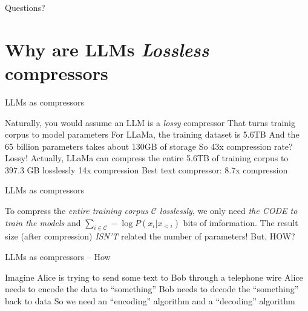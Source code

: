 \documentclass[scheme=plain]{ctexbeamer}
\begin{document}
\begin{frame}[standout]
  Questions?
\end{frame}

\section[LLMs as compressors]{Why are LLMs \emph{Lossless} compressors}

\begin{frame}{LLMs as compressors}
  \begin{outline}
    \1 Naturally, you would assume an LLM is a \emph{lossy} compressor
      \2 That turns trainig corpus to model parameters
      \2 For LLaMa, the training dataset is 5.6TB
      \2 And the 65 billion parameters takes about 130GB of storage
        \3 So 43x compression rate?
        \3 Lossy!
    \pause
    \1 Actually, LLaMa can compress the entire 5.6TB of training corpus to 397.3 GB losslessly
      \2 14x compression
      \2 Best text compressor: 8.7x compression
  \end{outline}
\end{frame}



\begin{frame}{LLMs as compressors}
  \begin{outline}
    \1 To compress the \emph{entire training corpus $\mathcal{C}$ losslessly}, we only need \emph{the CODE to train the models} and $\sum_{i \in \mathcal{C}} - \log P(x_i | x_{<i}) $ bits of imformation.
      \2 The result size (after compression) \emph{ISN'T} related the number of parameters!
      \pause
    \1 But, HOW?
  \end{outline}
\end{frame}

\begin{frame}{LLMs as compressors -- How}
  \begin{outline}
    \1 Imagine Alice is trying to send some text to Bob through a telephone wire
    \1 Alice needs to encode the data to ``something''
    \1 Bob needs to decode the ``something'' back to data
    \1 So we need an ``encoding'' algorithm and a ``decoding'' algorithm
  \end{outline}
\end{frame}
\end{document}
